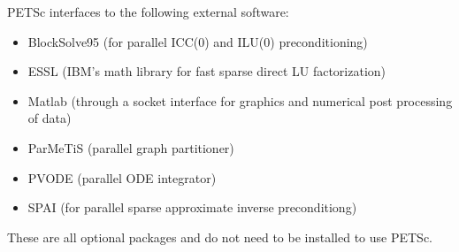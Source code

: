 \vspace{.3in}
\noindent
PETSc interfaces to the following external software:
\begin{itemize}
  \item BlockSolve95 (for parallel ICC(0) and ILU(0) preconditioning)
  \item ESSL         (IBM's math library for fast sparse direct LU factorization)
  \item Matlab       (through a socket interface for graphics and numerical post processing 
                      of data)
  \item ParMeTiS      (parallel graph partitioner)
  \item PVODE        (parallel ODE integrator)
  \item SPAI         (for parallel sparse approximate inverse preconditiong)
\end{itemize}
These are all optional packages and do not need to be installed to use PETSc.


